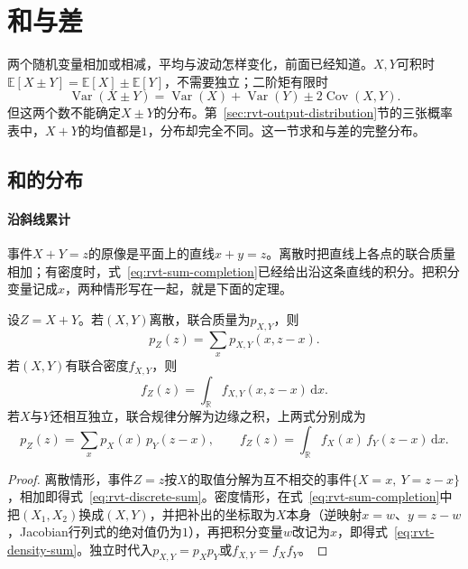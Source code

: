 \section{和与差}
\label{sec:rvt-sums-differences}

两个随机变量相加或相减，平均与波动怎样变化，前面已经知道。$X,Y$可积时$\mathbb{E}[X\pm Y]=\mathbb{E}[X]\pm\mathbb{E}[Y]$，不需要独立；二阶矩有限时
\[
 \operatorname{Var}(X\pm Y)=\operatorname{Var}(X)+\operatorname{Var}(Y)\pm2\operatorname{Cov}(X,Y) .
\]
但这两个数不能确定$X\pm Y$的分布。第~\ref{sec:rvt-output-distribution}节的三张概率表中，$X+Y$的均值都是$1$，分布却完全不同。这一节求和与差的完整分布。

\subsection{和的分布}
\label{sec:rvt-sum-distribution}

\paragraph{沿斜线累计}
事件$X+Y=z$的原像是平面上的直线$x+y=z$。离散时把直线上各点的联合质量相加；有密度时，式~\eqref{eq:rvt-sum-completion}已经给出沿这条直线的积分。把积分变量记成$x$，两种情形写在一起，就是下面的定理。

\begin{theorem}[和的分布]
\label{thm:rvt-sum-distribution}
设$Z=X+Y$。若$(X,Y)$离散，联合质量为$p_{X,Y}$，则
\begin{equation}
 p_Z(z)=\sum_{x}p_{X,Y}(x,z-x) .
 \label{eq:rvt-discrete-sum}
\end{equation}
若$(X,Y)$有联合密度$f_{X,Y}$，则
\begin{equation}
 f_Z(z)=\int_{\mathbb{R}}f_{X,Y}(x,z-x)\,\mathrm{d}x .
 \label{eq:rvt-density-sum}
\end{equation}
若$X$与$Y$还相互独立，联合规律分解为边缘之积，上两式分别成为
\begin{equation}
 p_Z(z)=\sum_{x}p_X(x)\,p_Y(z-x),\qquad f_Z(z)=\int_{\mathbb{R}}f_X(x)\,f_Y(z-x)\,\mathrm{d}x .
 \label{eq:rvt-convolution}
\end{equation}
\end{theorem}

\begin{proof}
离散情形，事件$Z=z$按$X$的取值分解为互不相交的事件$\{X=x,\ Y=z-x\}$，相加即得式~\eqref{eq:rvt-discrete-sum}。密度情形，在式~\eqref{eq:rvt-sum-completion}中把$(X_1,X_2)$换成$(X,Y)$，并把补出的坐标取为$X$本身（逆映射$x=w$、$y=z-w$，Jacobian行列式的绝对值仍为$1$），再把积分变量$w$改记为$x$，即得式~\eqref{eq:rvt-density-sum}。独立时代入$p_{X,Y}=p_Xp_Y$或$f_{X,Y}=f_Xf_Y$。
\end{proof}

